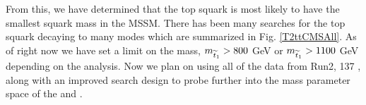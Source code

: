 From this, we have determined that the top squark is most likely to have the smallest squark mass in the MSSM. There has been many searches for the top squark decaying to many modes which are summarized in Fig. \ref{T2ttCMSAll}. As of right now we have set a limit on the \st{} mass, $m_{\widetilde{t}_1}>800$ GeV or $m_{\widetilde{t}_1}>1100$ GeV depending on the analysis. Now we plan on using all of the data from Run2, 137 \fb, along with an improved search design to probe further into the mass parameter space of the \st{} and \neutralino{}.
